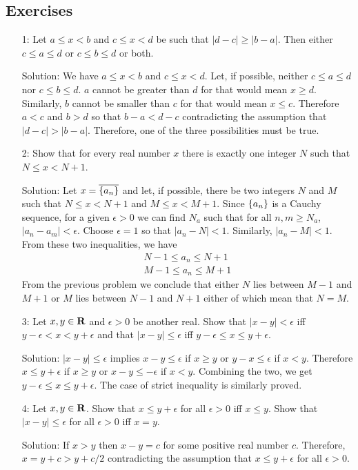 \subsection{Exercises}
\begin{enumerate}
\item[1:] Let $a \le x < b$ and $c \le x < d$ be such that $|d - c| \ge
|b - a|$. Then either $c \le a \le d$ or $c \le b \le d$ or both.
\item[Solution:] We have $a \le x < b$ and $c \le x < d$. Let, if 
possible, neither $c \le a \le d$ nor $c \le b \le d$. $a$ cannot be 
greater than $d$ for that would mean $x \ge d$. Similarly, $b$ cannot be
smaller than $c$ for that would mean $x \le c$. Therefore $a < c$ and $b 
> d$ so that $b - a < d - c$ contradicting the assumption that $|d - c| 
> |b - a|$. Therefore, one of the three possibilities must be true.

\item[2:] Show that for every real number $x$ there is exactly one integer
$N$ such that $N \le x < N + 1$.
\item[Solution:] Let $x = \overline{\{a_n\}}$ and let, if possible,
there be two integers $N$ and $M$ such that $N \le x < N + 1$ and $M \le
x < M + 1$. Since $\{a_n\}$ is a Cauchy sequence, for a given $\epsilon
> 0$ we can find $N_a$ such that for all $n, m \ge N_a$, $|a_n - a_m| 
< \epsilon$. Choose $\epsilon = 1$ so that $|a_n - N| < 1$. Similarly,
$|a_n - M| < 1$. From these two inequalities, we have
\begin{eqnarray}
N - 1 \le a_n \le N + 1 \\
M - 1 \le a_n \le M + 1
\end{eqnarray}
From the previous problem we conclude that either $N$ lies between $M - 1$
and $M + 1$ or $M$ lies between $N - 1$ and $N + 1$ either of which mean 
that $N = M$.

\item[3:] Let $x, y \in \mathbf{R}$ and $\epsilon > 0$ be another real. Show that
$|x - y| < \epsilon$ iff $y - \epsilon < x < y + \epsilon$ and that 
$|x - y| \le \epsilon$ iff $y - \epsilon \le x \le y + \epsilon$.
\item[Solution:] $|x - y| \le \epsilon$ implies $x - y \le \epsilon$ if 
$x \ge y$ or $y - x \le \epsilon$ if $x < y$. Therefore $x \le y + 
\epsilon$ if $x \ge y$ or $x - y \le -\epsilon$ if $x < y$. Combining the 
two, we get $y - \epsilon \le x \le y + \epsilon$. The case of strict 
inequality is similarly proved.

\item[4:] Let $x, y \in \mathbf{R}$. Show that $x \le y + \epsilon$ for all
$\epsilon > 0$ iff $x \le y$. Show that $|x - y| \le \epsilon$ for all
$\epsilon > 0$ iff $x = y$.
\item[Solution:] If $x > y$ then $x - y = c$ for some positive real number 
$c$. Therefore, $x = y + c > y + c/2$ contradicting the assumption that
$x \le y + \epsilon$ for all $\epsilon > 0$.


\end{enumerate}
